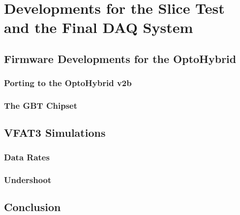 \chapter{Developments for the Slice Test and the Final DAQ System}
\label{chap:II-4-slice-test}

  \section{Firmware Developments for the OptoHybrid}

    \subsection{Porting to the OptoHybrid v2b}

    \subsection{The GBT Chipset}

  \section{VFAT3 Simulations}

    \subsection{Data Rates}

    \subsection{Undershoot}

  \section{Conclusion}
